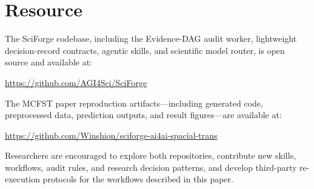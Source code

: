 \documentclass[sn-basic,Numbered,pdflatex]{sn-jnl}
\begin{document}
\section*{Resource}

The SciForge codebase, including the Evidence-DAG audit worker, lightweight decision-record contracts, agentic skills, and scientific model router, is open source and available at:

\vspace{4pt}
\centering
\url{https://github.com/AGI4Sci/SciForge}
\vspace{8pt}

\noindent The MCFST paper reproduction artifacts---including generated code, preprocessed data, prediction outputs, and result figures---are available at:

\vspace{4pt}
\centering
\url{https://github.com/Winshion/sciforge-ai4ai-spacial-trans}
\vspace{8pt}

\noindent Researchers are encouraged to explore both repositories, contribute new skills, workflows, audit rules, and research decision patterns, and develop third-party re-execution protocols for the workflows described in this paper.


\end{document}
